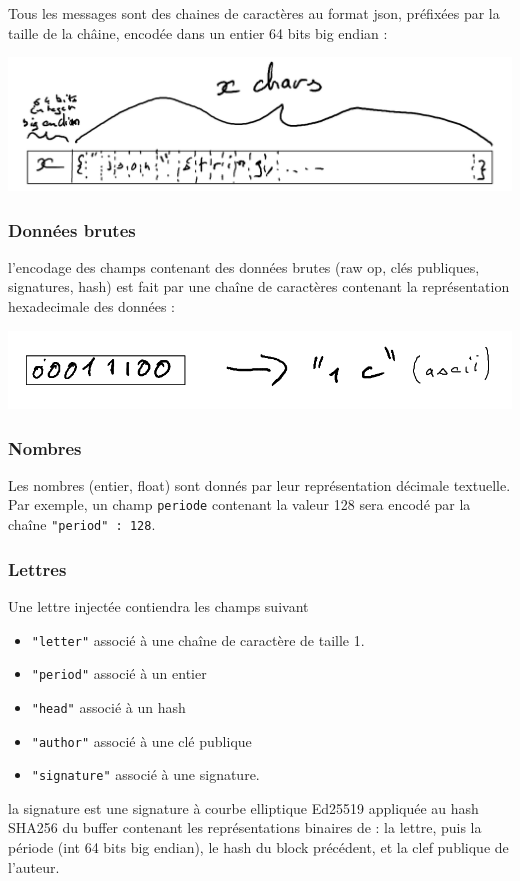 \documentclass{article}
\begin{document}
 Tous les messages sont des chaines de caractères au format json,
 préfixées par la taille de la châine, encodée dans un entier 64 bits
 big endian :

 \includegraphics{images/encodage_message.png}

 \subsubsection{Données brutes}
 \label{sec:enc-donnees-brutes}

 l'encodage des champs contenant des données brutes (raw op, clés
 publiques, signatures, hash) est fait par une chaîne de caractères
 contenant la représentation hexadecimale des données :

 \includegraphics{images/encodage_octets.png}

 \subsubsection{Nombres}
 \label{sec:enc-nombres}

 Les nombres (entier, float) sont donnés par leur représentation
 décimale textuelle.  Par exemple, un champ \texttt{periode} contenant
 la valeur 128 sera encodé par la chaîne \texttt{"period" : 128}.

 \subsubsection{Lettres}
 \label{sec:enc-lettres}
 Une lettre injectée contiendra les champs suivant
 \begin{itemize}
 \item \texttt{"letter"} associé à une chaîne de caractère de taille
   1.
 \item \texttt{"period"} associé à un entier
 \item \texttt{"head"} associé à un hash
 \item \texttt{"author"} associé à une clé publique
 \item \texttt{"signature"} associé à une signature.
 \end{itemize}
 la signature est une signature à courbe elliptique Ed25519 appliquée
 au hash SHA256 du buffer contenant les représentations binaires de :
 la lettre, puis la période (int 64 bits big endian), le hash du block
 précédent, et la clef publique de l'auteur.
\end{document}
